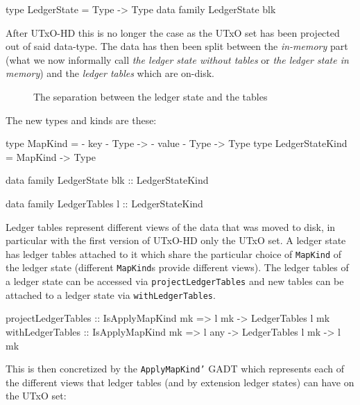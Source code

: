 \documentclass[11pt,a4paper]{article}
\newcommand{\htt}[1]{\texttt{#1}}
\theoremstyle{definition}
\begin{document}
\begin{code}
type LedgerState = Type -> Type
data family LedgerState blk
\end{code}

After UTxO-HD this is no longer the case as the UTxO set has been projected out
of said data-type. The data has then been split between the \emph{in-memory}
part (what we now informally call \emph{the ledger state without tables} or
\emph{the ledger state in memory}) and the \emph{ledger tables} which are
on-disk.

\begin{figure}[h]
  \centering
  \caption{The separation between the ledger state and the tables}
\end{figure}

The new types and kinds are these:

\begin{code}
type MapKind         = {- key -} Type -> {- value -} Type -> Type
type LedgerStateKind = MapKind -> Type

data family LedgerState blk :: LedgerStateKind

data family LedgerTables l :: LedgerStateKind
\end{code}

Ledger tables represent different views of the data that was moved to disk, in
particular with the first version of UTxO-HD only the UTxO set. A ledger state
has ledger tables attached to it which share the particular choice of \htt{MapKind} of the ledger state (different \htt{MapKind}s provide different
views). The ledger tables of a ledger state can be accessed via \htt{projectLedgerTables} and new tables can be attached to a ledger state via \htt{withLedgerTables}.

\begin{code}
projectLedgerTables :: IsApplyMapKind mk => l mk  -> LedgerTables l mk
withLedgerTables    :: IsApplyMapKind mk => l any -> LedgerTables l mk -> l mk
\end{code}

This is then concretized by the \htt{ApplyMapKind'} GADT which represents each
of the different views that ledger tables (and by extension ledger states) can
have on the UTxO set:
\end{document}
